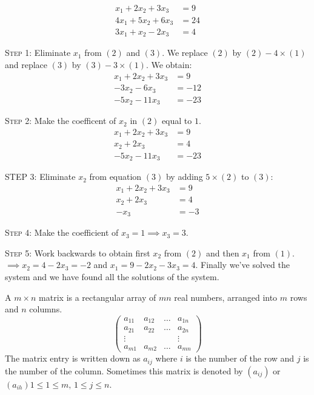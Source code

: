 \documentclass[10pt]{scrartcl}
\begin{document}
\begin{example}
\begin{align*}
  x_1 + 2x_2 + 3x_3 &= 9 \tag{1}\\
  4x_1 + 5x_2 + 6x_3 &= 24 \tag{2}\\
  3x_1 + x_2 - 2x_3 &= 4\tag{3}
\end{align*}
	
\textsc{Step 1:} Eliminate $x_1$ from $(2)$ and $(3)$. We replace $(2)$ by $(2) - 4\times(1)$ and replace $(3)$ by $(3) - 3 \times(1)$. We obtain:
\begin{align*}
  x_1 + 2x_2 + 3x_3 &= 9\\
  -3x_2 -6x_3 &= -12\\
  -5x_2 -11x_3 &= -23
\end{align*}

\textsc{Step 2:} Make the coefficent of $x_2$ in $(2)$ equal to $1$.
\begin{align*}
  x_1 + 2x_2 + 3x_3 &= 9\\
  x_2 + 2x_3 &= 4\\
  -5x_2 - 11x_3 &= -23
\end{align*}

\textsc{STEP 3:} Eliminate $x_2$ from equation $(3)$ by adding $5 \times(2)$ to $(3)$: 
\begin{align*}
  x_1 + 2x_2 + 3x_3 &= 9\\
  x_2 + 2x_3 &= 4\\
  -x_3 &= -3
\end{align*}

\textsc{Step 4:} Make the coefficient of $x_3 = 1 \implies x_3 = 3$. 

\textsc{Step 5:} Work backwards to obtain first $x_2$ from $(2)$ and then $x_1$ from $(1)$. $\implies x_2 = 4-2x_3 = -2$ and $x_1 = 9-2x_2 -3x_3 = 4$. Finally we've solved the system and we have found all the solutions of the system. 
\end{example}


\vspace*{5pt}

\begin{definition}A $m\times n$ matrix is a rectangular array of $mn$ real numbers, arranged into $m$ rows and $n$ columns. 
\[
  \begin{pmatrix}
  a_{11} & a_{12} &\dots & a_{1n} \\
  a_{21} & a_{22} & \dots &a_{2n}\\
  \vdots & & & \vdots\\
  a_{m1} & a_{m2} & \dots &a_{mn}	
  \end{pmatrix}
\]
The matrix entry is written down as $a_{ij}$ where $i$ is the number of the row and $j$ is the number of the column. Sometimes this matrix is denoted by $(a_{ij})$ or $(a_{ih}) 1 \leq 1 \leq m,\,1\leq j \leq n$. 
\end{definition}
\end{document}
